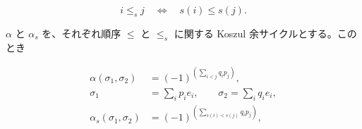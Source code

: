 \begin{equation}
  i\leq_s j\quad\Longleftrightarrow\quad s(i)\leq s(j).
  \tag{1.6.5.1}
\end{equation}

$\alpha$ と $\alpha_s$ を、それぞれ順序 $\leq$ と $\leq_s$ に関する
Koszul 余サイクルとする。このとき

\begin{equation}
  \begin{aligned}
    \alpha(\sigma_1,\sigma_2)
      &=(-1)^{\left(\sum_{i<j}q_i p_j\right)},\\
    \sigma_1&=\sum_i p_i e_i,
      \qquad \sigma_2=\sum_i q_i e_i,\\
    \alpha_s(\sigma_1,\sigma_2)
      &=(-1)^{\left(\sum_{s(i)<s(j)}q_i p_j\right)},
  \end{aligned}
  \tag{1.6.5.2}
\end{equation}
